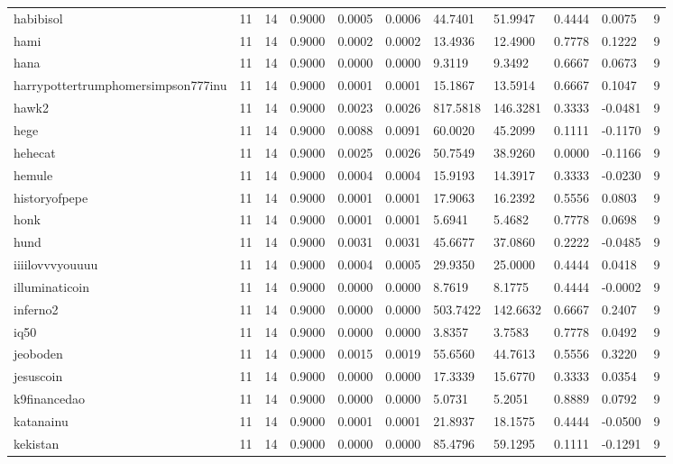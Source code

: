\begin{table}[htbp]
\begin{tabular}{lllllllllll}
habibisol & 11 & 14 & 0.9000 & 0.0005 & 0.0006 & 44.7401 & 51.9947 & 0.4444 & 0.0075 & 9 \\
hami & 11 & 14 & 0.9000 & 0.0002 & 0.0002 & 13.4936 & 12.4900 & 0.7778 & 0.1222 & 9 \\
hana & 11 & 14 & 0.9000 & 0.0000 & 0.0000 & 9.3119 & 9.3492 & 0.6667 & 0.0673 & 9 \\
harrypottertrumphomersimpson777inu & 11 & 14 & 0.9000 & 0.0001 & 0.0001 & 15.1867 & 13.5914 & 0.6667 & 0.1047 & 9 \\
hawk2 & 11 & 14 & 0.9000 & 0.0023 & 0.0026 & 817.5818 & 146.3281 & 0.3333 & -0.0481 & 9 \\
hege & 11 & 14 & 0.9000 & 0.0088 & 0.0091 & 60.0020 & 45.2099 & 0.1111 & -0.1170 & 9 \\
hehecat & 11 & 14 & 0.9000 & 0.0025 & 0.0026 & 50.7549 & 38.9260 & 0.0000 & -0.1166 & 9 \\
hemule & 11 & 14 & 0.9000 & 0.0004 & 0.0004 & 15.9193 & 14.3917 & 0.3333 & -0.0230 & 9 \\
historyofpepe & 11 & 14 & 0.9000 & 0.0001 & 0.0001 & 17.9063 & 16.2392 & 0.5556 & 0.0803 & 9 \\
honk & 11 & 14 & 0.9000 & 0.0001 & 0.0001 & 5.6941 & 5.4682 & 0.7778 & 0.0698 & 9 \\
hund & 11 & 14 & 0.9000 & 0.0031 & 0.0031 & 45.6677 & 37.0860 & 0.2222 & -0.0485 & 9 \\
iiiilovvvyouuuu & 11 & 14 & 0.9000 & 0.0004 & 0.0005 & 29.9350 & 25.0000 & 0.4444 & 0.0418 & 9 \\
illuminaticoin & 11 & 14 & 0.9000 & 0.0000 & 0.0000 & 8.7619 & 8.1775 & 0.4444 & -0.0002 & 9 \\
inferno2 & 11 & 14 & 0.9000 & 0.0000 & 0.0000 & 503.7422 & 142.6632 & 0.6667 & 0.2407 & 9 \\
iq50 & 11 & 14 & 0.9000 & 0.0000 & 0.0000 & 3.8357 & 3.7583 & 0.7778 & 0.0492 & 9 \\
jeoboden & 11 & 14 & 0.9000 & 0.0015 & 0.0019 & 55.6560 & 44.7613 & 0.5556 & 0.3220 & 9 \\
jesuscoin & 11 & 14 & 0.9000 & 0.0000 & 0.0000 & 17.3339 & 15.6770 & 0.3333 & 0.0354 & 9 \\
k9financedao & 11 & 14 & 0.9000 & 0.0000 & 0.0000 & 5.0731 & 5.2051 & 0.8889 & 0.0792 & 9 \\
katanainu & 11 & 14 & 0.9000 & 0.0001 & 0.0001 & 21.8937 & 18.1575 & 0.4444 & -0.0500 & 9 \\
kekistan & 11 & 14 & 0.9000 & 0.0000 & 0.0000 & 85.4796 & 59.1295 & 0.1111 & -0.1291 & 9 \\

\end{tabular}
\end{table}
